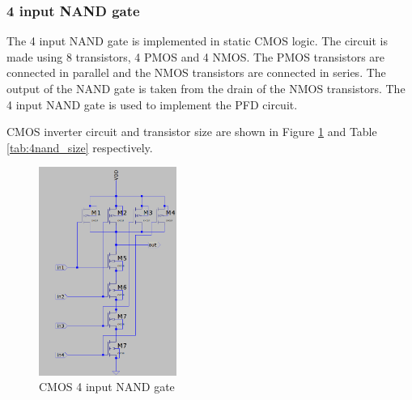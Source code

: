\subsubsection{4 input NAND gate}
The 4 input NAND gate is implemented in static CMOS logic. The circuit is made using 8 transistors, 4 PMOS and 4 NMOS. The PMOS transistors are connected in parallel and the NMOS transistors are connected in series. The output of the NAND gate is taken from the
drain of the NMOS transistors. The 4 input NAND gate is used to implement the PFD circuit.

CMOS inverter circuit and transistor size are shown in Figure \ref{fig:4nand_circuit} and Table \ref{tab:4nand_size} respectively.
\begin{figure}[H]
	\centering
	\includegraphics[width=0.4\textwidth]{figs/4nand_circuit.png}
	\caption{CMOS 4 input NAND gate}
	\label{fig:4nand_circuit}
	\vspace{0.5cm}
\end{figure}

\begin{table}[H]
	\caption{Transistor size of 4 input NAND gate}
	\label{tab:4nand_size}
	\vspace{0.5cm}
\end{table}	

